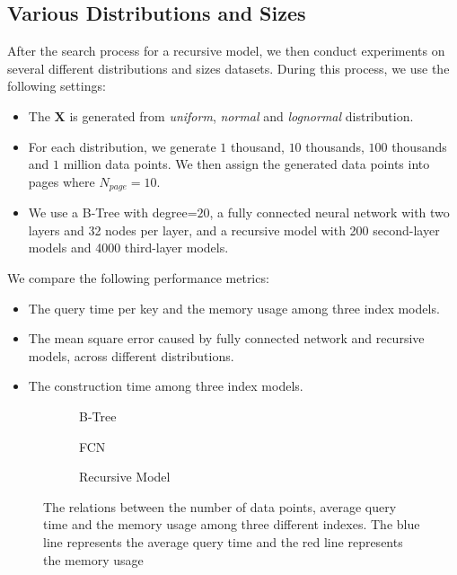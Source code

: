\subsection{Various Distributions and Sizes}

After the search process for a recursive model, we then conduct experiments on several different distributions and sizes datasets. During this process, we use the following settings:

\begin{itemize}
	\item The $\boldsymbol{X}$ is generated from \textit{uniform}, \textit{normal} and \textit{lognormal} distribution.
	\item For each distribution, we generate $1$ thousand, $10$ thousands, $100$ thousands and $1$ million data points. We then assign the generated data points into pages where $N_{page}=10$.
	\item We use a B-Tree with degree=$20$, a fully connected neural network with two layers and 32 nodes per layer, and a recursive model with 200 second-layer models and 4000 third-layer models.
\end{itemize}

We compare the following performance metrics:

\begin{itemize}
	\item The query time per key and the memory usage among three index models.
	\item The mean square error caused by fully connected network and recursive models, across different distributions.
	\item The construction time among three index models.
\end{itemize}

\begin{figure}
 \centering
     \begin{subfigure}[b]{0.28\textwidth}
         \centering
         
         \caption{B-Tree}
         \label{fig:exp2_1_btree}
     \end{subfigure}
     \hfill
     \begin{subfigure}[b]{0.28\textwidth}
         \centering
         
         \caption{FCN}
         \label{fig:exp2_1_fcn}
     \end{subfigure}
     \hfill
     \begin{subfigure}[b]{0.28\textwidth}
         \centering
         
         \caption{Recursive Model}
         \label{fig:exp2_1_rmi}
     \end{subfigure}
        \caption{The relations between the number of data points, average query time and the memory usage among three different indexes. The blue line represents the average query time and the red line represents the memory usage}
        \label{fig:exp2_1}
\end{figure}

